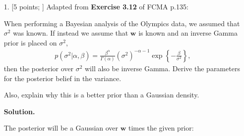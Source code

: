 \documentclass[10pt]{article}
\begin{document}
\begin{itemize}

\item[1.]  [5 points; \boldred{Required only for Graduates}]
Adapted from {\bf Exercise 3.12} of FCMA p.135:

When performing a Bayesian analysis of the Olympics data, we assumed that $\sigma^2$ was known.  If instead we assume that $\mathbf{w}$ is known and an inverse Gamma prior is placed on $\sigma^2$,
\begin{eqnarray*}
p(\sigma^2 | \alpha, \beta) = \frac{\beta^{\alpha}}{\Gamma(\alpha)} (\sigma^2)^{-\alpha-1} \exp \left\{-\frac{\beta}{\sigma^2} \right\},
\end{eqnarray*}
then the posterior over $\sigma^2$ will also be inverse Gamma.  Derive the parameters for the posterior belief in the variance.  

Also, explain why this is a better prior than a Gaussian density.

{\bf Solution.}

The posterior will be a Gaussian over $\mathbf{w}$ times the given prior:


\end{itemize}
\end{document}
